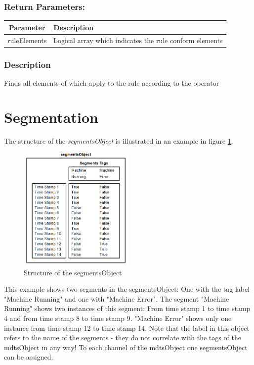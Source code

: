 \documentclass[a4]{scrreprt}
\begin{document}
\subsubsection{Return Parameters:}

\begin{longtabu} to \textwidth {|c|X|}
	\hline
	\textbf{Parameter} & \textbf{Description} \\ \hline
	\endhead
	ruleElements & Logical array which indicates the rule conform elements \\ \hline
\end{longtabu}

\subsubsection{Description}

Finds all elements of which apply to the rule according to the operator

\section{Segmentation}

The structure of the \textit{segmentsObject} is illustrated in an example in figure \ref{FigSegmentsObjectStructure}.

\begin{figure}[htbp]
	\centering
	\includegraphics[width=0.5\textwidth]{Media/segmentsObjectStructure.png}
	\caption{Structure of the segmentsObject}
	\label{FigSegmentsObjectStructure}
\end{figure}

This example shows two segments in the segmentsObject: One with the tag label "Machine Running" and one with "Machine Error". The segment "Machine Running" shows two instances of this segment: From time stamp 1 to time stamp 4 and from time stamp 8 to time stamp 9. "Machine Error" shows only one instance from time stamp 12 to time stamp 14. Note that the label in this object refers to the name of the segments - they do not correlate with the tags of the mdtsObject in any way!
To each channel of the mdtsObject one segmentsObject can be assigned.
\end{document}
